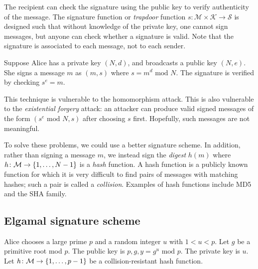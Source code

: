 The recipient can check the signature using the public key to verify authenticity of the message.
The signature function or \emph{trapdoor} function \( s \colon \mathcal M \times \mathcal K \to \mathcal S \) is designed such that without knowledge of the private key, one cannot sign messages, but anyone can check whether a signature is valid.
Note that the signature is associated to each message, not to each sender.
\begin{example}
    Suppose Alice has a private key \( (N, d) \), and broadcasts a public key \( (N, e) \).
    She signs a message \( m \) as \( (m, s) \) where \( s = m^d \text{ mod } N \).
    The signature is verified by checking \( s^e = m \).

    This technique is vulnerable to the homomorphism attack.
    This is also vulnerable to the \emph{existential forgery} attack: an attacker can produce valid signed messages of the form \( (s^e \text{ mod } N, s) \) after choosing \( s \) first.
    Hopefully, such messages are not meaningful.

    To solve these problems, we could use a better signature scheme.
    In addition, rather than signing a message \( m \), we instead sign the \emph{digest} \( h(m) \) where \( h \colon \mathcal M \to \qty{1, \dots, N-1} \) is a \emph{hash} function.
    A hash function is a publicly known function for which it is very difficult to find pairs of messages with matching hashes; such a pair is called a \emph{collision}.
    Examples of hash functions include MD5 and the SHA family.
\end{example}

\subsection{Elgamal signature scheme}
Alice chooses a large prime \( p \) and a random integer \( u \) with \( 1 < u < p \).
Let \( g \) be a primitive root mod \( p \).
The public key is \( p, g, y = g^u \text{ mod } p \).
The private key is \( u \).
Let \( h \colon \mathcal M \to \qty{1, \dots, p-1} \) be a collision-resistant hash function.

